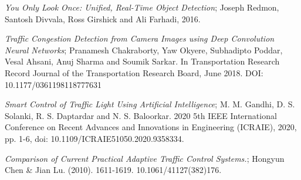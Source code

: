 \documentclass[openany,12pt]{report}
\begin{document}

	
	\begin{thebibliography}{99}
		
		\emph{You Only Look Once: Unified, Real-Time Object Detection}; Joseph Redmon, Santosh Divvala, Ross Girshick and Ali Farhadi, 2016.
		
		\emph{Traffic Congestion Detection from Camera Images using Deep Convolution Neural Networks}; Pranamesh Chakraborty, Yaw Okyere, Subhadipto Poddar, Vesal Ahsani, Anuj Sharma and Soumik Sarkar. In Transportation Research Record Journal of the Transportation Research Board, June 2018. DOI: 10.1177/0361198118777631
		
		\emph{Smart Control of Traffic Light Using Artificial Intelligence}; M. M. Gandhi, D. S. Solanki, R. S. Daptardar and N. S. Baloorkar. 2020 5th IEEE International Conference on Recent Advances and Innovations in Engineering (ICRAIE), 2020, pp. 1-6, doi: 10.1109/ICRAIE51050.2020.9358334.
		
		\emph{Comparison of Current Practical Adaptive Traffic Control Systems.}; Hongyun Chen \& Jian Lu. (2010). 1611-1619. 10.1061/41127(382)176. 
		
		
	\end{thebibliography}
\end{document}
